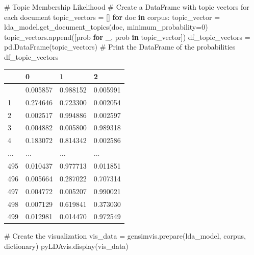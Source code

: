 \documentclass[
  letterpaper,
  DIV=11,
  numbers=noendperiod]{scrreprt}
\newenvironment{Shaded}{\begin{snugshade}}{\end{snugshade}}
\newcommand{\CommentTok}[1]{\textcolor[rgb]{0.37,0.37,0.37}{#1}}
\newcommand{\ControlFlowTok}[1]{\textcolor[rgb]{0.00,0.23,0.31}{\textbf{#1}}}
\newcommand{\DecValTok}[1]{\textcolor[rgb]{0.68,0.00,0.00}{#1}}
\newcommand{\KeywordTok}[1]{\textcolor[rgb]{0.00,0.23,0.31}{\textbf{#1}}}
\newcommand{\NormalTok}[1]{\textcolor[rgb]{0.00,0.23,0.31}{#1}}
\newcommand{\OperatorTok}[1]{\textcolor[rgb]{0.37,0.37,0.37}{#1}}
\newcounter{none} %
\begin{document}
\begin{Shaded}
\begin{Highlighting}[]
\CommentTok{\# Topic Membership Likelihood }
\CommentTok{\# Create a DataFrame with topic vectors for each document}
\NormalTok{topic\_vectors }\OperatorTok{=}\NormalTok{ []}
\ControlFlowTok{for}\NormalTok{ doc }\KeywordTok{in}\NormalTok{ corpus:}
\NormalTok{    topic\_vector }\OperatorTok{=}\NormalTok{ lda\_model.get\_document\_topics(doc, minimum\_probability}\OperatorTok{=}\DecValTok{0}\NormalTok{)}
\NormalTok{    topic\_vectors.append([prob }\ControlFlowTok{for}\NormalTok{ \_, prob }\KeywordTok{in}\NormalTok{ topic\_vector])}
\NormalTok{df\_topic\_vectors }\OperatorTok{=}\NormalTok{ pd.DataFrame(topic\_vectors)}
\CommentTok{\# Print the DataFrame of the probabilities}
\NormalTok{df\_topic\_vectors}
\end{Highlighting}
\end{Shaded}

{\def\LTcaptype{none} %
\begin{longtable}[]{@{}llll@{}}
\toprule\noalign{}
& 0 & 1 & 2 \\
\midrule\noalign{}
\endhead
\bottomrule\noalign{}
\endlastfoot
0 & 0.005857 & 0.988152 & 0.005991 \\
1 & 0.274646 & 0.723300 & 0.002054 \\
2 & 0.002517 & 0.994886 & 0.002597 \\
3 & 0.004882 & 0.005800 & 0.989318 \\
4 & 0.183072 & 0.814342 & 0.002586 \\
... & ... & ... & ... \\
495 & 0.010437 & 0.977713 & 0.011851 \\
496 & 0.005664 & 0.287022 & 0.707314 \\
497 & 0.004772 & 0.005207 & 0.990021 \\
498 & 0.007129 & 0.619841 & 0.373030 \\
499 & 0.012981 & 0.014470 & 0.972549 \\
\end{longtable}
}

\begin{Shaded}
\begin{Highlighting}[]
\CommentTok{\# Create the visualization }
\NormalTok{vis\_data }\OperatorTok{=}\NormalTok{ gensimvis.prepare(lda\_model, corpus, dictionary) }
\NormalTok{pyLDAvis.display(vis\_data)}
\end{Highlighting}
\end{Shaded}
\end{document}
